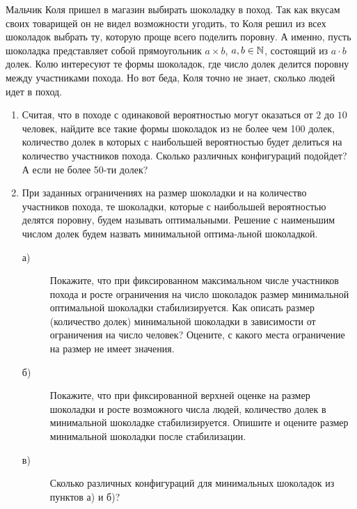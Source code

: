 
Мальчик Коля пришел в магазин выбирать шоколадку в поход. Так как вкусам своих товарищей он не видел возможности угодить, то Коля решил из всех шоколадок выбрать ту, которую проще всего поделить поровну. А именно, пусть шоколадка представляет собой прямоугольник $a\times b$, $a, b \in \mathbb{N}$, состоящий из $a\cdot b$ долек. Колю интересуют те формы шоколадок, где число долек делится поровну между участниками похода. Но вот беда, Коля точно не знает, сколько людей идет в поход.
\begin{enumerate}
\item Считая, что в походе с одинаковой вероятностью могут оказаться от $2$ до $10$ человек, найдите все такие формы шоколадок из не более чем 100 долек, количество долек в которых с наибольшей вероятностью будет делиться на количество участников похода. Сколько различных конфигураций подойдет? А если не более 50-ти долек?
\item При заданных ограничениях на размер шоколадки и на количество участников похода, те шоколадки, которые с наибольшей вероятностью делятся поровну, будем называть оптимальными. Решение с наименьшим числом долек будем назвать минимальной оптима-\linebreak льной шоколадкой.
\begin{description}
\item[а)] Покажите, что при фиксированном максимальном числе участников похода и росте ограничения на число шоколадок размер минимальной оптимальной шоколадки стабилизируется. Как описать размер (количество долек) минимальной шоколадки в зависимости от ограничения на число человек? Оцените, с какого места ограничение на размер не имеет значения.
\item[б)] Покажите, что при фиксированной верхней оценке на размер шоколадки и росте возможного числа людей, количество долек в минимальной шоколадке стабилизируется. Опишите и оцените размер минимальной шоколадки после стабилизации.
\item[в)] Сколько различных конфигураций для минимальных шоколадок из пунктов а) и б)?
\end{description}


\end{enumerate}
